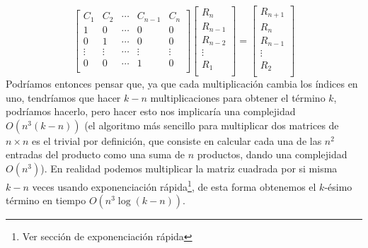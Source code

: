\[
\begin{bmatrix}
C_1 & C_2 & \cdots & C_{n-1} & C_n\\
1 & 0 & \cdots & 0 & 0\\
0 & 1 & \cdots & 0 & 0\\
\vdots & \vdots & \cdots & \vdots & \vdots\\
0 & 0 & \cdots & 1 & 0\\
\end{bmatrix}
\begin{bmatrix}
R_n\\
R_{n-1}\\
R_{n-2}\\
\vdots\\
R_1\\
\end{bmatrix}
=
\begin{bmatrix}
R_{n+1}\\
R_{n}\\
R_{n-1}\\
\vdots\\
R_2\\
\end{bmatrix}
\]
Podríamos entonces pensar que, ya que cada multiplicación cambia los índices en uno, tendríamos que hacer $k-n$ multiplicaciones para obtener el término $k$, podríamos hacerlo, pero hacer esto
nos implicaría una complejidad $O(n^3(k-n))$ (el algoritmo más sencillo para multiplicar dos
matrices de $n\times n$ es el trivial por definición, que consiste en calcular cada una de las
$n^2$ entradas del producto como una suma de $n$ productos, dando una complejidad $O(n^3)$). En realidad podemos multiplicar la matriz cuadrada por si misma $k-n$ veces usando exponenciación rápida\footnote{Ver sección de exponenciación rápida}, de esta forma obtenemos el $k$-ésimo término en tiempo $O(n^3\log(k-n))$.

